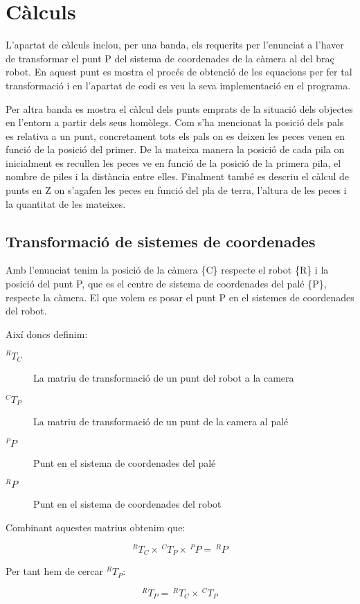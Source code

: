\section{Càlculs}
L'apartat de càlculs inclou, per una banda, els requerits per l'enunciat a l'haver de transformar
el punt P del sistema de coordenades de la càmera al del braç robot. En aquest punt es mostra
el procés de obtenció de les equacions per fer tal transformació i en l'apartat de codi
es veu la seva implementació en el programa.

Per altra banda es mostra el càlcul dels punts emprats de la situació dels objectes en l'entorn
a partir dels seus homòlegs. Com s'ha mencionat la posició dels pals es relativa a un punt,
concretament tots els pals on es deixen les peces venen en funció de la posició del primer.
De la mateixa manera la posició de cada pila on inicialment es recullen les peces
ve en funció de la posició de la primera pila, el nombre de piles i la distància entre elles.
Finalment també es descriu el càlcul de punts en Z on s'agafen les peces en funció del pla
de terra, l'altura de les peces i la quantitat de les mateixes.

\subsection{Transformació de sistemes de coordenades}
Amb l'enunciat tenim la posició de la càmera \{C\} respecte el robot \{R\} i
la posició del punt P, que es el centre de sistema de coordenades del palé \{P\},
respecte la càmera. El que volem es posar el punt P en el sistemes de coordenades del robot.

Així doncs definim:

\begin{description}
\item[$^RT_C$] La matriu de transformació de un punt del robot a la camera
\item[$^CT_P$] La matriu de transformació de un punt de la camera al palé
\item[$^PP$] Punt en el sistema de coordenades del palé
\item[$^RP$] Punt en el sistema de coordenades del robot
\end{description}

Combinant aquestes matrius obtenim que:

$$ ^RT_C \times \,^CT_P \times \,^PP = \,^RP $$

Per tant hem de cercar $^RT_P$:

$$ ^RT_P = \,^RT_C \times \,^CT_P $$

